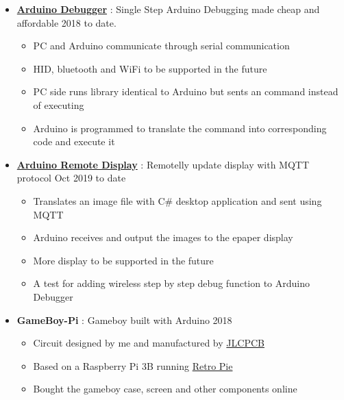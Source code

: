   \begin{itemize}

    \item \href{https://github.com/RustColeone/ArduinoDebugger}{\color{link}\textbf{Arduino Debugger}} : Single Step Arduino Debugging made cheap and affordable \dashdiv{} 2018 to date.

    \begin{itemize}
      \item PC and Arduino communicate through serial communication
      \item HID, bluetooth and WiFi to be supported in the future
      \item PC side runs library identical to Arduino but sents an command instead of executing
      \item Arduino is programmed to translate the command into corresponding code and execute it
    \end{itemize}

    \item \href{https://github.com/RustColeone/ArduinoRemoteDisplay}{\color{link}\textbf{Arduino Remote Display}} : Remotelly update display with MQTT protocol\dashdiv{} Oct 2019 to date

    \begin{itemize}
      \item Translates an image file with C\# desktop application and sent using MQTT
      \item Arduino receives and output the images to the epaper display
      \item More display to be supported in the future
      \item A test for adding wireless step by step debug function to Arduino Debugger
    \end{itemize}

    \item \textbf{GameBoy-Pi} : Gameboy built with Arduino \dashdiv{} 2018

    \begin{itemize}
      \item Circuit designed by me and manufactured by \href{https://jlcpcb.com/}{\color{link}JLCPCB}
      \item Based on a Raspberry Pi 3B running \href{https://retropie.org.uk/}{\color{link}Retro Pie}
      \item Bought the gameboy case, screen and other components online
    \end{itemize}


\end{itemize}
